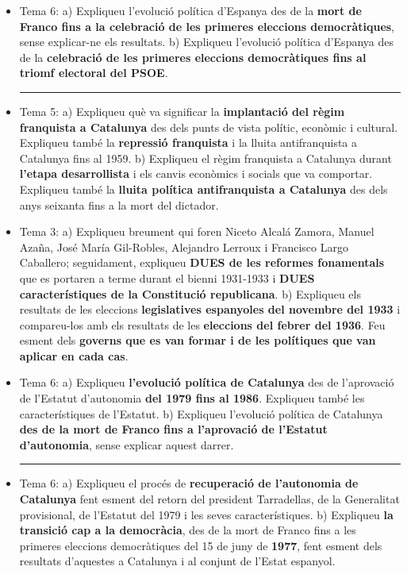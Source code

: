 \documentclass[arial,a4paper,print]{article}
\begin{document}
\begin{itemize}
\item Tema 6: 
\subitem a) Expliqueu l’evolució política d’Espanya des de la \textbf{mort de Franco fins a la celebració de les primeres eleccions democràtiques}, sense explicar-ne els resultats.
\subitem b){\tiny } Expliqueu  l’evolució  política  d’Espanya  des  de  la  \textbf{celebració  de  les  primeres  eleccions  democràtiques fins al triomf electoral del PSOE}.

\noindent\rule{\linewidth}{0.4pt}

\item Tema 5:
\subitem a) Expliqueu què va significar la \textbf{implantació del règim franquista a Catalunya} des dels punts de  vista  polític,  econòmic  i  cultural.  Expliqueu  també  la  \textbf{repressió  franquista}  i  la  lluita  antifranquista a Catalunya fins al 1959.
\subitem b) Expliqueu  el  règim  franquista  a  Catalunya  durant  \textbf{l’etapa  desarrollista}  i  els  canvis  econòmics  i  socials  que  va  comportar.  Expliqueu  també  la  \textbf{lluita  política  antifranquista  a  Catalunya} des dels anys seixanta fins a la mort del dictador.

\item Tema 3: 
\subitem a) Expliqueu  breument  qui  foren  Niceto  Alcalá  Zamora,  Manuel  Azaña,  José  María  Gil-Robles,  Alejandro  Lerroux  i  Francisco  Largo  Caballero;  seguidament,  expliqueu  \textbf{DUES  de  les  reformes  fonamentals}  que  es  portaren  a  terme  durant  el  bienni  1931-1933  i  \textbf{DUES característiques de la Constitució republicana}.
\subitem b) Expliqueu  els  resultats  de  les  eleccions  \textbf{legislatives  espanyoles  del  novembre  del  1933}  i  compareu-los  amb  els  resultats  de  les  \textbf{eleccions  del  febrer  del  1936}.  Feu  esment  dels  \textbf{governs que es van formar i de les polítiques que van aplicar en cada cas}.

\item Tema 6:
\subitem a) Expliqueu \textbf{l’evolució política de Catalunya} des de l’aprovació de l’Estatut d’autonomia \textbf{del 1979 fins al 1986}. Expliqueu també les característiques de l’Estatut.
\subitem b) Expliqueu l’evolució política de Catalunya \textbf{des de la mort de Franco fins a l’aprovació de l’Estatut d’autonomia}, sense explicar aquest darrer.

\noindent\rule{\linewidth}{0.4pt}

\item Tema 6:
\subitem a) Expliqueu  el  procés  de  \textbf{recuperació  de  l’autonomia  de  Catalunya}  fent  esment  del  retorn  del  president  Tarradellas,  de  la  Generalitat  provisional,  de  l’Estatut  del  1979  i  les  seves  característiques.
\subitem b) Expliqueu  \textbf{la  transició  cap  a  la  democràcia},  des  de  la  mort  de  Franco  fins  a  les  primeres  eleccions  democràtiques  del  15  de  juny  de  \textbf{1977},  fent  esment  dels  resultats  d’aquestes  a  Catalunya i al conjunt de l’Estat espanyol.


\end{itemize}
\end{document}
